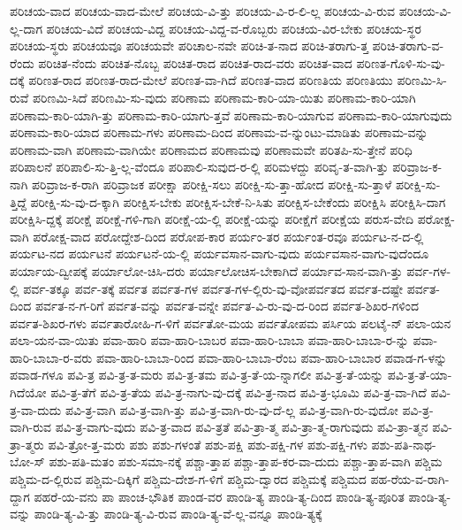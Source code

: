 {ಪರಿಚಯ-ವಾದ
ಪರಿಚಯ-ವಾದ-ಮೇಲೆ
ಪರಿಚಯ-ವಿ-ತ್ತು
ಪರಿಚಯ-ವಿ-ರ-ಲಿ-ಲ್ಲ
ಪರಿಚಯ-ವಿ-ರುವ
ಪರಿಚಯ-ವಿ-ಲ್ಲ-ದಾಗ
ಪರಿಚಯ-ವಿದೆ
ಪರಿಚಯ-ವಿದ್ದ
ಪರಿಚಯ-ವಿದ್ದ-ವ-ರೊಬ್ಬರು
ಪರಿಚಯ-ವಿರ-ಬೇಕು
ಪರಿಚಯ-ಸ್ಥರ
ಪರಿಚಯ-ಸ್ಥರು
ಪರಿಚಯವೂ
ಪರಿಚಯವೇ
ಪರಿಚಾಲ-ನವೇ
ಪರಿಚಿ-ತ-ನಾದ
ಪರಿಚಿ-ತರಾಗು-ತ್ತ
ಪರಿಚಿ-ತರಾಗು-ವ-ರೆಂದು
ಪರಿಚಿತ-ನೆಂದು
ಪರಿಚಿತ-ನೊಬ್ಬ
ಪರಿಚಿತ-ರಾದ
ಪರಿಚಿತ-ರಾದ-ವರು
ಪರಿಚಿತ-ವಾದ
ಪರಿಣತ-ಗೊಳಿ-ಸು-ವು-ದಕ್ಕೆ
ಪರಿಣತ-ರಾದ
ಪರಿಣತ-ರಾದ-ಮೇಲೆ
ಪರಿಣತ-ವಾ-ಗಿದೆ
ಪರಿಣತ-ವಾದ
ಪರಿಣತಿಯ
ಪರಿಣತಿಯು
ಪರಿಣಮಿ-ಸಿ-ರುವೆ
ಪರಿಣಮಿ-ಸಿದೆ
ಪರಿಣಮಿ-ಸು-ವುದು
ಪರಿಣಾಮ
ಪರಿಣಾಮ-ಕಾರಿ-ಯಾ-ಯಿತು
ಪರಿಣಾಮ-ಕಾರಿ-ಯಾಗಿ
ಪರಿಣಾಮ-ಕಾರಿ-ಯಾಗಿ-ತ್ತು
ಪರಿಣಾಮ-ಕಾರಿ-ಯಾಗು-ತ್ತವೆ
ಪರಿಣಾಮ-ಕಾರಿ-ಯಾಗುವ
ಪರಿಣಾಮ-ಕಾರಿ-ಯಾಗುವುದು
ಪರಿಣಾಮ-ಕಾರಿ-ಯಾದ
ಪರಿಣಾಮ-ಗಳು
ಪರಿಣಾಮ-ದಿಂದ
ಪರಿಣಾಮ-ವ-ನ್ನುಂಟು-ಮಾಡಿತು
ಪರಿಣಾಮ-ವನ್ನು
ಪರಿಣಾಮ-ವಾಗಿ
ಪರಿಣಾಮ-ವಾಗಿಯೇ
ಪರಿಣಾಮದ
ಪರಿಣಾಮವು
ಪರಿಣಾಮವೇ
ಪರಿತಪಿ-ಸು-ತ್ತೇನೆ
ಪರಿಧಿ
ಪರಿಪಾಲನೆ
ಪರಿಪಾಲಿ-ಸು-ತ್ತಿ-ಲ್ಲ-ವೆಂದೂ
ಪರಿಪಾಲಿ-ಸುವುದ-ರ-ಲ್ಲಿ
ಪರಿಮಳದ್ದು
ಪರಿವೃ-ತ-ವಾಗಿ-ತ್ತು
ಪರಿವ್ರಾಜ-ಕ-ನಾಗಿ
ಪರಿವ್ರಾಜ-ಕ-ರಾಗಿ
ಪರಿವ್ರಾಜಕ
ಪರೀಕ್ಷಾ
ಪರೀಕ್ಷಿ-ಸಲು
ಪರೀಕ್ಷಿ-ಸು-ತ್ತಾ-ಹೋದ
ಪರೀಕ್ಷಿ-ಸು-ತ್ತಾಳೆ
ಪರೀಕ್ಷಿ-ಸು-ತ್ತಿದ್ದೆ
ಪರೀಕ್ಷಿ-ಸು-ವು-ದ-ಕ್ಕಾಗಿ
ಪರೀಕ್ಷಿಸ-ಬೇಕು
ಪರೀಕ್ಷಿಸ-ಬೇಕೆ-ನಿ-ಸಿತು
ಪರೀಕ್ಷಿಸ-ಬೇಕೆಂದು
ಪರೀಕ್ಷಿಸಿ
ಪರೀಕ್ಷಿಸಿ-ದಾಗ
ಪರೀಕ್ಷಿಸಿ-ದ್ದಕ್ಕೆ
ಪರೀಕ್ಷೆ
ಪರೀಕ್ಷೆ-ಗಳಿ-ಗಾಗಿ
ಪರೀಕ್ಷೆ-ಯ-ಲ್ಲಿ
ಪರೀಕ್ಷೆ-ಯನ್ನು
ಪರೀಕ್ಷೆಗೆ
ಪರೀಕ್ಷೆಯ
ಪರುಸ-ವೇದಿ
ಪರೋಕ್ಷ-ವಾಗಿ
ಪರೋಕ್ಷ-ವಾದ
ಪರೋದ್ದೇಶ-ದಿಂದ
ಪರೋಪ-ಕಾರ
ಪರ್ಯಂ-ತರ
ಪರ್ಯಂತ-ರವೂ
ಪರ್ಯಟ-ನ-ದ-ಲ್ಲಿ
ಪರ್ಯಟ-ನದ
ಪರ್ಯಟನೆ
ಪರ್ಯಟನೆ-ಯ-ಲ್ಲಿ
ಪರ್ಯವಸಾನ-ವಾಗು-ವುದು
ಪರ್ಯವಸಾನ-ವಾಗು-ವುದೆಂದೂ
ಪರ್ಯಾಯ-ದ್ವೀಪಕ್ಕೆ
ಪರ್ಯಾಲೋ-ಚಿಸಿ-ದರು
ಪರ್ಯಾಲೋಚಿಸ-ಬೇಕಾಗಿದೆ
ಪರ್ಯಾವ-ಸಾನ-ವಾಗಿ-ತ್ತು
ಪರ್ವ-ಗಳ-ಲ್ಲಿ
ಪರ್ವ-ತಕ್ಕೂ
ಪರ್ವ-ತಕ್ಕೆ
ಪರ್ವತ
ಪರ್ವತ-ಗಳ
ಪರ್ವತ-ಗಳ-ಲ್ಲಿರು-ವು-ವೋಪರ್ವತದ
ಪರ್ವತ-ದಷ್ಟೇ
ಪರ್ವತ-ದಿಂದ
ಪರ್ವತ-ನ-ಗ-ರಿಗೆ
ಪರ್ವತ-ವನ್ನು
ಪರ್ವತ-ವನ್ನೇ
ಪರ್ವತ-ವಿ-ರು-ವು-ದ-ರಿಂದ
ಪರ್ವತ-ಶಿಖರ-ಗಳಿಂದ
ಪರ್ವತ-ಶಿಖರ-ಗಳು
ಪರ್ವತಾರೋಹಿ-ಗ-ಳಿಗೆ
ಪರ್ವತೋ-ಮಯ
ಪರ್ವತೋಪಮ
ಪರ್ಸಿಯ
ಪಲಟೈ-ನ್
ಪಲಾ-ಯನ
ಪಲಾ-ಯನ-ವಾ-ಯಿತು
ಪವಾ-ಹಾರಿ
ಪವಾ-ಹಾರಿ-ಬಾಬರ
ಪವಾ-ಹಾರಿ-ಬಾಬಾ
ಪವಾ-ಹಾರಿ-ಬಾಬಾ-ರ-ನ್ನು
ಪವಾ-ಹಾರಿ-ಬಾಬಾ-ರ-ವರು
ಪವಾ-ಹಾರಿ-ಬಾಬಾ-ರಿಂದ
ಪವಾ-ಹಾರಿ-ಬಾಬಾ-ರೆಂಬ
ಪವಾ-ಹಾರಿ-ಬಾಬಾರ
ಪವಾಡ-ಗ-ಳನ್ನು
ಪವಾಡ-ಗಳೂ
ಪವಿ-ತ್ರ
ಪವಿ-ತ್ರ-ತ-ಮರು
ಪವಿ-ತ್ರ-ತಮ
ಪವಿ-ತ್ರ-ತೆ-ಯ-ನ್ನಾಗಲೀ
ಪವಿ-ತ್ರ-ತೆ-ಯನ್ನು
ಪವಿ-ತ್ರ-ತೆ-ಯಾ-ಗಿದೆಯೋ
ಪವಿ-ತ್ರ-ತೆಗೆ
ಪವಿ-ತ್ರ-ತೆಯ
ಪವಿ-ತ್ರ-ನಾಗು-ವು-ದಕ್ಕೆ
ಪವಿ-ತ್ರ-ನಾದ
ಪವಿ-ತ್ರ-ಭೂಮಿ
ಪವಿ-ತ್ರ-ವಾ-ಗಿದೆ
ಪವಿ-ತ್ರ-ವಾ-ದುದು
ಪವಿ-ತ್ರ-ವಾಗಿ
ಪವಿ-ತ್ರ-ವಾಗಿ-ತ್ತು
ಪವಿ-ತ್ರ-ವಾಗಿ-ರು-ವು-ದೆ-ಲ್ಲ
ಪವಿ-ತ್ರ-ವಾಗಿ-ರು-ವುದೋ
ಪವಿ-ತ್ರ-ವಾಗಿ-ರುವ
ಪವಿ-ತ್ರ-ವಾಗು-ವುದು
ಪವಿ-ತ್ರ-ವಾದ
ಪವಿ-ತ್ರತೆ
ಪವಿ-ತ್ರಾ-ತ್ಮ
ಪವಿ-ತ್ರಾ-ತ್ಮ-ರಾಗುವುದು
ಪವಿ-ತ್ರಾ-ತ್ಮನ
ಪವಿ-ತ್ರಾ-ತ್ಮರು
ಪವಿ-ತ್ರೋ-ತ್ತ-ಮರು
ಪಶು
ಪಶು-ಗಳಂತೆ
ಪಶು-ಪಕ್ಷಿ
ಪಶು-ಪಕ್ಷಿ-ಗಳ
ಪಶು-ಪಕ್ಷಿ-ಗಳು
ಪಶು-ಪತಿ-ನಾಥ-ಬೋ-ಸ್
ಪಶು-ಪತಿ-ಮತಂ
ಪಶು-ಸಮಾ-ನಕ್ಕೆ
ಪಶ್ಚಾ-ತ್ತಾಪ
ಪಶ್ಚಾ-ತ್ತಾಪ-ಕರ-ವಾ-ದುದು
ಪಶ್ಚಾ-ತ್ತಾಪ-ವಾಗಿ
ಪಶ್ಚಿಮ
ಪಶ್ಚಿಮ-ದ-ಲ್ಲಿರುವ
ಪಶ್ಚಿಮ-ದಿಕ್ಕಿಗೆ
ಪಶ್ಚಿಮ-ದೇಶ-ಗ-ಳಿಗೆ
ಪಶ್ಚಿಮ-ದ್ವಾರದ
ಪಶ್ಚಿಮಕ್ಕೆ
ಪಶ್ಚಿಮದ
ಪಹ-ರೆಯ-ವ-ರಾಗಿ-ದ್ದಾಗ
ಪಹರೆ-ಯ-ವನು
ಪಾ
ಪಾಂಚ-ಭೌತಿಕ
ಪಾಂಡ-ವರ
ಪಾಂಡಿ-ತ್ಯ
ಪಾಂಡಿ-ತ್ಯ-ದಿಂದ
ಪಾಂಡಿ-ತ್ಯ-ಪೂರಿತ
ಪಾಂಡಿ-ತ್ಯ-ವನ್ನು
ಪಾಂಡಿ-ತ್ಯ-ವಿ-ತ್ತು
ಪಾಂಡಿ-ತ್ಯ-ವಿ-ರುವ
ಪಾಂಡಿ-ತ್ಯ-ವೆ-ಲ್ಲ-ವನ್ನೂ
ಪಾಂಡಿ-ತ್ಯಕ್ಕೆ
}
